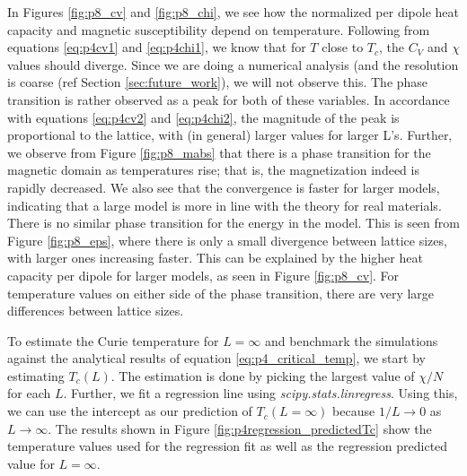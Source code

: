 \documentclass[../main_proj4_correct_template.tex]{subfiles}
\begin{document}
In Figures \ref{fig:p8_cv} and \ref{fig:p8_chi}, we see how the normalized per dipole heat capacity and magnetic susceptibility depend on temperature. Following from equations \eqref{eq:p4cv1} and \eqref{eq:p4chi1}, we know that for $T$ close to $T_c$, the $C_V$ and $\chi$ values should diverge. Since we are doing a numerical analysis (and the resolution is coarse (ref Section \ref{sec:future_work}), we will not observe this. The phase transition is rather observed as a peak for both of these variables. In accordance with equations \eqref{eq:p4cv2} and \eqref{eq:p4chi2}, the magnitude of the peak is proportional to the lattice, with (in general) larger values for larger L's. Further, we observe from Figure \ref{fig:p8_mabs} that there is a phase transition for the magnetic domain as temperatures rise; that is, the magnetization indeed is rapidly decreased. We also see that the convergence is faster for larger models, indicating that a large model is more in line with the theory for real materials. There is no similar phase transition for the energy in the model. This is seen from Figure \ref{fig:p8_eps}, where there is only a small divergence between lattice sizes, with larger ones increasing faster. This can be explained by the higher heat capacity per dipole for larger models, as seen in Figure \ref{fig:p8_cv}. For temperature values on either side of the phase transition, there are very large differences between lattice sizes.

To estimate the Curie temperature for $L=\infty$ and benchmark the simulations against the analytical results of equation \eqref{eq:p4_critical_temp}, we start by estimating $T_c(L)$. The estimation is done by picking the largest value of $\chi/N$ for each $L$. Further, we fit a regression line using \textit{scipy.stats.linregress}. Using this, we can use the intercept as our prediction of $T_c(L=\infty)$ because $1/L \to 0$ as $L\to \infty$. The results shown in Figure \ref{fig:p4regression_predictedTc} show the temperature values used for the regression fit as well as the regression predicted value for $L=\infty$.
\end{document}
